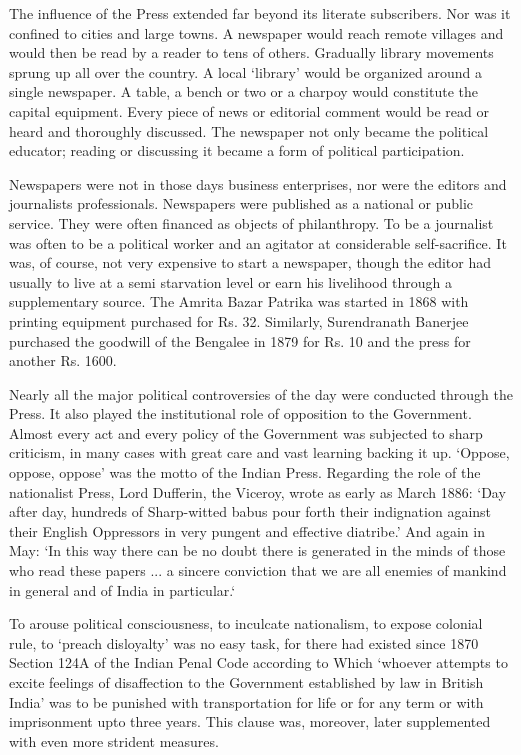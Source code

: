 The influence of the Press extended far beyond its literate subscribers. Nor was it confined to cities and large towns. A newspaper would reach remote villages and would then be read by a reader to tens of others. Gradually library movements sprung up all over the country. A local `library' would be organized around a single newspaper. A table, a bench or two or a charpoy would constitute the capital equipment. Every piece of news or editorial comment would be read or heard and thoroughly discussed. The newspaper not only became the political educator; reading or discussing it became a form of political participation.

Newspapers were not in those days business enterprises, nor were the editors and journalists professionals. Newspapers were published as a national or public service. They were often financed as objects of philanthropy. To be a journalist was often to be a political worker and an agitator at considerable self-sacrifice. It was, of course, not very expensive to start a newspaper, though the editor had usually to live at a semi starvation level or earn his livelihood through a supplementary source. The Amrita Bazar Patrika was started in 1868 with printing equipment purchased for Rs. 32. Similarly, Surendranath Banerjee purchased the goodwill of the Bengalee in 1879 for Rs. 10 and the press for another Rs. 1600.

Nearly all the major political controversies of the day were conducted through the Press. It also played the institutional role of opposition to the Government. Almost every act and every policy of the Government was subjected to sharp criticism, in many cases with great care and vast learning backing it up. `Oppose, oppose, oppose' was the motto of the Indian Press. Regarding the role of the nationalist Press, Lord Dufferin, the Viceroy, wrote as early as March 1886: `Day after day, hundreds of Sharp-witted babus pour forth their indignation against their English Oppressors in very pungent and effective diatribe.' And again in May: `In this way there can be no doubt there is generated in the minds of those who read these papers ... a sincere conviction that we are all enemies of mankind in general and of India in particular.`

To arouse political consciousness, to inculcate nationalism, to expose colonial rule, to `preach disloyalty' was no easy task, for there had existed since 1870 Section 124A of the Indian Penal Code according to Which `whoever attempts to excite feelings of disaffection to the Government established by law in British India' was to be punished with transportation for life or for any term or with imprisonment upto three years. This clause was, moreover, later supplemented with even more strident measures.

